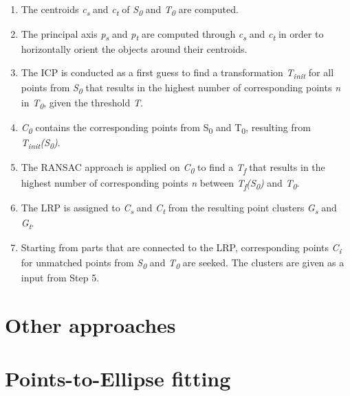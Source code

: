 \begin{enumerate}
	\item The centroids \textit{c\textsubscript{s}} and \textit{c\textsubscript{t}} of \textit{S\textsubscript{0}} and \textit{T\textsubscript{0}} are computed.
	
	\item The principal axis \textit{p\textsubscript{s}} and \textit{p\textsubscript{t}}  are computed through \textit{c\textsubscript{s}} and \textit{c\textsubscript{t}} in order to horizontally orient the objects around their centroids.
	
	\item The ICP is conducted as a first guess to find a transformation \textit{T\textsubscript{init}} for all points from \textit{S\textsubscript{0}} that results in the highest number of corresponding points \textit{n} in \textit{T\textsubscript{0}}, given the threshold \textit{T}.
	
	\item \textit{C\textsubscript{0}} contains the corresponding points from S\textsubscript{0} and T\textsubscript{0}, resulting from \textit{T\textsubscript{init}(S\textsubscript{0})}.
	
	\item The RANSAC approach is applied on \textit{C\textsubscript{0}} to find a  \textit{T\textsubscript{f}} that results in the highest number of corresponding points \textit{n} between \textit{T\textsubscript{f}(S\textsubscript{0})} and \textit{T\textsubscript{0}}.
	
	\item The LRP is assigned to \textit{C\textsubscript{s}} and \textit{C\textsubscript{t}} from the resulting point clusters \textit{G\textsubscript{s}} and \textit{G\textsubscript{t}}.
	
	\item Starting from parts that are connected to the LRP, corresponding points \textit{C\textsubscript{i}} for unmatched points from \textit{S\textsubscript{0}} and \textit{T\textsubscript{0}} are seeked. The clusters are given as a input from Step 5. 
		
\end{enumerate}

\section{Other approaches}

\section{Points-to-Ellipse fitting}

